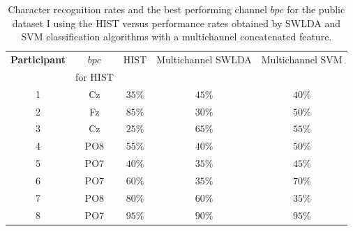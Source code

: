 \begin{table}[h!]
\caption[Dataset I - Comparisons of Character Recognition Rates]{Character recognition rates and the best performing channel $bpc$ for the public dataset I  using the HIST versus performance rates obtained by SWLDA and SVM classification algorithms with a multichannel concatenated feature.}
\centering
\begin{tabular}{c|cc|c|c}
\toprule
\textbf{Participant}	&  $bpc$	&  HIST & Multichannel SWLDA & Multichannel SVM \\
                                    &  for HIST        &           &                                       &   \\
\midrule
1     &     Cz   &   $35\%$  & $45\%$  & $40\%$\\
2     &     Fz   &   $85\%$  & $30\%$   & $50\%$   \\
3     &     Cz   &   $25\%$  & $65\%$ & $55\%$   \\
4     &     PO8 &   $55\%$ & $40\%$  & $50\%$   \\
5     &     PO7 &   $40\%$ & $35\%$  & $45\%$   \\
6     &     PO7 &   $60\%$ &  $35\%$  & $70\%$   \\
7     &     PO8 &   $80\%$ & $60\%$   & $35\%$   \\
8     &     PO7 &   $95\%$  & $90\%$   & $95\%$  \\

\end{tabular}
\label{tab:resultsalsswlda}
\end{table}



